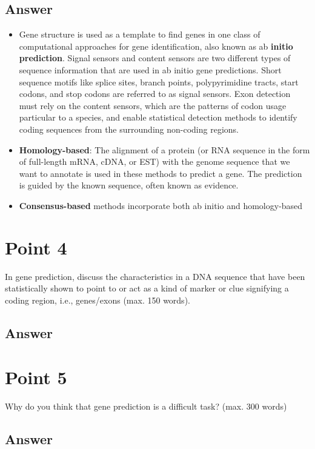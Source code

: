 \documentclass{article}
\begin{document}
\subsection*{Answer}
\begin{itemize}
    \item Gene structure is used as a template to find genes in one class of computational approaches for gene identification, also known as ab \textbf{initio prediction}. Signal sensors and content sensors are two different types of sequence information that are used in ab initio gene predictions. Short sequence motifs like splice sites, branch points, polypyrimidine tracts, start codons, and stop codons are referred to as signal sensors. Exon detection must rely on the content sensors, which are the patterns of codon usage particular to a species, and enable statistical detection methods to identify coding sequences from the surrounding non-coding regions.
    \item \textbf{Homology-based}: The alignment of a protein (or RNA sequence in the form of full-length mRNA, cDNA, or EST) with the genome sequence that we want to annotate is used in these methods to predict a gene. The prediction is guided by the known sequence, often known as evidence.
    \item \textbf{Consensus-based} methods incorporate both ab initio and homology-based 
\end{itemize}

\section{Point 4}
In gene prediction, discuss the characteristics in a DNA sequence that have been
statistically shown to point to or act as a kind of marker or clue signifying a coding
region, i.e., genes/exons (max. 150 words).
\subsection*{Answer}

\section{Point 5}
Why do you think that gene prediction is a difficult task? (max. 300 words)
\subsection*{Answer}
\end{document}
